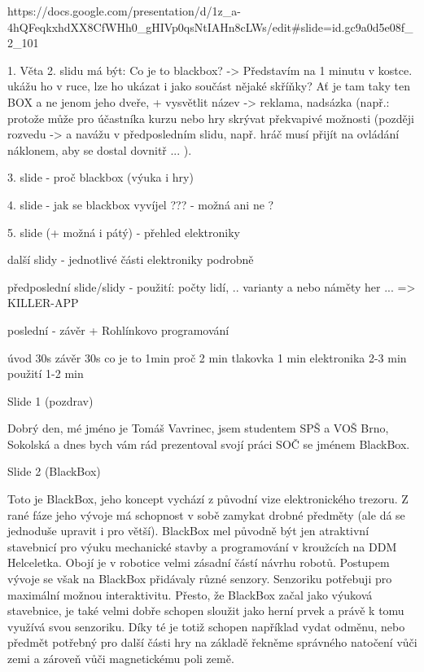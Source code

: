 https://docs.google.com/presentation/d/1z_a-4hQFeqkxhdXX8CfWHh0_gHIVp0qsNtIAHn8cLWs/edit#slide=id.gc9a0d5e08f_2_101

1. Věta 2. slidu má být: Co je to blackbox? -> Představím na 1 minutu v kostce.  
ukážu ho v ruce, lze ho ukázat i jako součást nějaké skříňky? Ať je tam taky ten BOX  
a ne jenom jeho dveře, 
+ vysvětlit název -> reklama, nadsázka (např.: protože může pro účastníka kurzu nebo 
hry skrývat překvapivé možnosti (později rozvedu -> a navážu v předposledním slidu, 
např. hráč musí přijít na ovládání náklonem, aby se dostal dovnitř ... ).


3. slide - proč blackbox (výuka i hry)

4. slide - jak se blackbox vyvíjel ??? - možná ani ne ? 

5. slide (+ možná i pátý) - přehled elektroniky 

další slidy - jednotlivé části elektroniky podrobně %


předposlední slide/slidy - použití: počty lidí, .. varianty a nebo náměty her ... => KILLER-APP

poslední - závěr + Rohlínkovo programování  

úvod 30s závěr 30s 
co je to 1min 
proč 2 min 
tlakovka 1 min 
elektronika 2-3 min 
použití 1-2 min 


Slide 1 (pozdrav)

Dobrý den, mé jméno je Tomáš Vavrinec, jsem studentem SPŠ a VOŠ Brno, Sokolská
a dnes bych vám rád prezentoval svojí práci SOČ se jménem BlackBox.



Slide 2 (BlackBox)

Toto je BlackBox, jeho koncept vychází z původní vize elektronického trezoru.
Z rané fáze jeho vývoje má schopnost v sobě zamykat drobné předměty (ale dá se jednoduše upravit i pro větší).
BlackBox mel původně být jen atraktivní stavebnicí pro výuku mechanické stavby a programování
v kroužcích na DDM Helceletka.
Obojí je v robotice velmi zásadní částí návrhu robotů.
Postupem vývoje se však na BlackBox přidávaly různé senzory. 
Senzoriku potřebuji pro maximální možnou interaktivitu. Přesto, že BlackBox začal jako výuková stavebnice, 
je také velmi dobře 
schopen sloužit jako herní prvek a právě k tomu využívá svou senzoriku. Díky té je totiž schopen například vydat odměnu, nebo
předmět potřebný pro další části hry na základě řekněme správného natočení vůči zemi a zároveň vůči magnetickému poli země.

